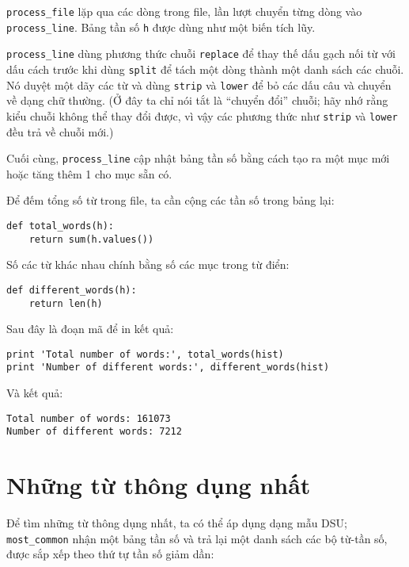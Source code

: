\documentclass[11pt]{book}
\begin{document}

\verb"process_file" lặp qua các dòng trong file,
lần lượt chuyển từng dòng vào \verb"process_line". Bảng tần số
{\tt h} được dùng như một biến tích lũy.


\verb"process_line" dùng phương thức chuỗi {\tt replace} để thay thế
dấu gạch nối từ với dấu cách trước khi dùng {\tt split} để tách 
một dòng thành một danh sách các chuỗi. Nó duyệt một dãy các từ và dùng {\tt strip} và {\tt lower} để bỏ các dấu câu và chuyển về dạng chữ thường. (Ở đây
ta chỉ nói tắt là ``chuyển đổi'' chuỗi; hãy nhớ rằng kiểu chuỗi 
không thể thay đổi được, vì vậy các phương thức như {\tt strip} và {\tt lower}
đều trả về chuỗi mới.)

Cuối cùng, \verb"process_line" cập nhật bảng tần số bằng cách tạo ra một
mục mới hoặc tăng thêm 1 cho mục sẵn có.


Để đếm tổng số từ trong file, ta cần cộng các tần số trong bảng lại:

\beforeverb
\begin{verbatim}
def total_words(h):
    return sum(h.values())
\end{verbatim}
\afterverb
%
Số các từ khác nhau chính bằng số các mục trong từ điển:

\beforeverb
\begin{verbatim}
def different_words(h):
    return len(h)
\end{verbatim}
\afterverb
%
Sau đây là đoạn mã để in kết quả:

\beforeverb
\begin{verbatim}
print 'Total number of words:', total_words(hist)
print 'Number of different words:', different_words(hist)
\end{verbatim}
\afterverb
%
Và kết quả:

\beforeverb
\begin{verbatim}
Total number of words: 161073
Number of different words: 7212
\end{verbatim}
\afterverb
%

\section{Những từ thông dụng nhất}


Để tìm những từ thông dụng nhất, ta có thể áp dụng dạng mẫu DSU;
\verb"most_common" nhận một bảng tần số và trả lại một danh sách các
bộ từ-tần số, được sắp xếp theo thứ tự tần số giảm dần:
\end{document}
